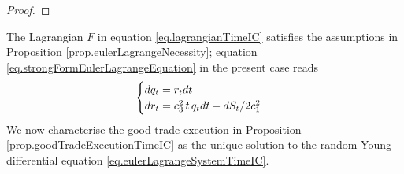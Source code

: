 \documentclass[10pt,a4paper]{article}
\begin{document}
\begin{proof}
%		
%		
	\end{proof}

	The Lagrangian $F$ in equation \eqref{eq.lagrangianTimeIC} satisfies the assumptions in Proposition \ref{prop.eulerLagrangeNecessity}; equation \eqref{eq.strongFormEulerLagrangeEquation} in the present case reads
	\begin{equation}\label{eq.eulerLagrangeSystemTimeIC}
	\begin{cases}
	dq_t=r_{t} dt \\
	dr_{t} = c_{3}^{2} \, t \, q_t dt - dS_t / 2c_{1}^{2}
	\end{cases}
	\end{equation}
	We now characterise the good trade execution in Proposition \ref{prop.goodTradeExecutionTimeIC} as the unique solution to the random Young differential equation \eqref{eq.eulerLagrangeSystemTimeIC}.
\end{document}
